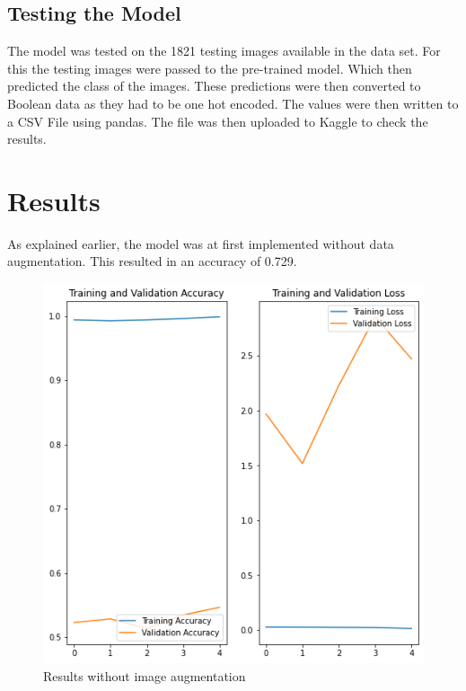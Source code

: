 \documentclass[10pt,twocolumn,letterpaper]{article}
\begin{document}
\subsection{Testing the Model}
The model was tested on the 1821 testing images available in the data set. For this the testing images were passed to the pre-trained model. Which then predicted the class of the images. These predictions were then converted to Boolean data as they had to be one hot encoded. The values were then written to a CSV File using pandas. The file was then uploaded to Kaggle to check the results. 


\section{Results}
As explained earlier, the model was at first implemented without data augmentation. This resulted in an accuracy of 0.729. 
\begin{figure}[h]
    \centering
    \includegraphics[scale= 0.3]{images/without_augmentation.png}
    \caption{Results without image augmentation}
    \label{fig:without_augmentation}
\end{figure}
\end{document}
